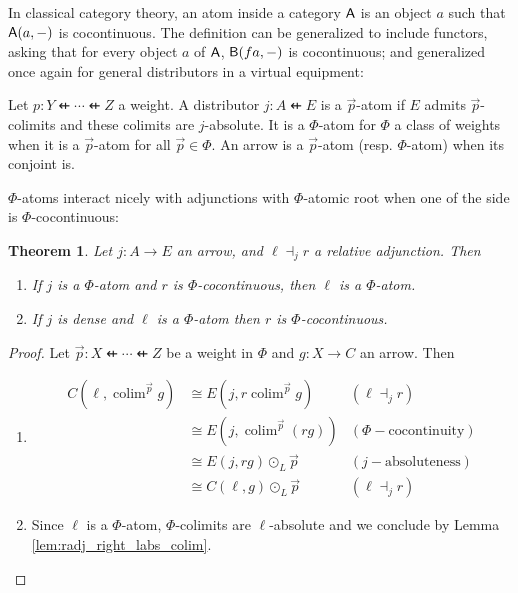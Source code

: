 \documentclass[10pt,a4paper]{article}
\newcommand{\cat}[1]{\textcat{#1}}
\newcommand{\textcat}[1]{{\normalfont\textsf{#1}}}
\newcommand{\dfrom}{\nvleftarrow}
\newcommand{\simeqq}{\cong}
\DeclareMathOperator{\colim}{colim}
\theoremstyle{plain}
\newtheorem{theorem}{Theorem}[subsection]
\theoremstyle{definition}
\theoremstyle{remark}
\begin{document}
In classical category theory, an atom inside a category $\cat A$ is an object $a$ such that $\cat A(a, -)$ is cocontinuous. The definition can be generalized to include functors, asking that for every object $a$ of $\cat A$, $\cat B(fa, -)$ is cocontinuous; and generalized once again for general distributors in a virtual equipment:

\begin{definition}
    Let $p : Y \dfrom \cdots \dfrom Z$ a weight. A distributor $j : A \dfrom E$ is a $\vec p$-atom if $E$ admits $\vec p$-colimits and these colimits are $j$-absolute. It is a $\Phi$-atom for $\Phi$ a class of weights when it is a $\vec p$-atom for all $\vec p\in\Phi$. An arrow is a $\vec p$-atom (resp. $\Phi$-atom) when its conjoint is.
\end{definition}

$\Phi$-atoms interact nicely with adjunctions with $\Phi$-atomic root when one of the side is $\Phi$-cocontinuous:

\begin{theorem}
    Let $j : A \to E$ an arrow, and $\ell\dashv_j r$ a relative adjunction. Then
    \begin{enumerate}
        \item If $j$ is a $\Phi$-atom and $r$ is $\Phi$-cocontinuous, then $\ell$ is a $\Phi$-atom.
        \item If $j$ is dense and $\ell$ is a $\Phi$-atom then $r$ is $\Phi$-cocontinuous.
    \end{enumerate}
\end{theorem}

\begin{proof}
    Let $\vec p : X \dfrom \cdots \dfrom Z$ be a weight in $\Phi$ and $g : X \to C$ an arrow. Then
    \begin{enumerate}
        \item \begin{align*}
                C(\ell, \colim^{\vec p}g) &\simeqq E(j, r\colim^{\vec p}g) & (\ell\dashv_jr)\\
                                          &\simeqq E(j, \colim^{\vec p}(rg)) & (\Phi-\text{cocontinuity})\\
                                          &\simeqq E(j, rg)\odot_L \vec p & (j-\text{absoluteness})\\
                                          &\simeqq C(\ell, g)\odot_L \vec p & (\ell\dashv_jr)
            \end{align*}
        \item Since $\ell$ is a $\Phi$-atom, $\Phi$-colimits are $\ell$-absolute and we conclude by Lemma \ref{lem:radj_right_labs_colim}.
    \end{enumerate}
\end{proof}
\end{document}
